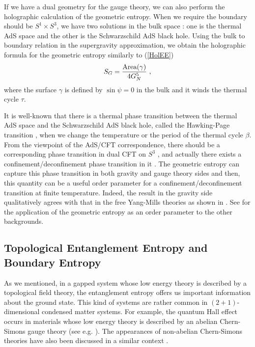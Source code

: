 \documentclass[12pt]{article}
\def\frac#1#2{{#1\over #2}}
\def\g{{\gamma}}
\def\b{{\beta}}
\def\frac#1#2{{#1\over #2}}
\def\g{{\gamma}}
\def\b{{\beta}}
\begin{document}
If we have a dual geometry for the gauge theory, we can also perform the holographic calculation
of the geometric entropy. When we require the boundary should be $S^1 \times S^3$, we have two solutions
in the bulk space \cite{Witten}: one is the thermal AdS space
and the other is the Schwarzschild AdS black hole. Using the bulk to boundary relation in the supergravity approximation, we obtain
the holographic formula for the geometric entropy similarly to (\ref{HolEE})
\begin{equation}
S_G =\frac{\mbox{Area}(\gamma)}{4G_N^{5}} \ ,
\end{equation}
where the surface $\g$ is defined by $\sin\psi =0$ in the bulk and it winds the thermal cycle $\tau$.

It is well-known that there is a thermal phase transition between the thermal AdS space
and the Schwarzschild AdS black hole, called the Hawking-Page transition \cite{HaPe},
when we change the temperature or the period of the thermal cycle $\b$.
From the viewpoint of the AdS/CFT correspondence, there should be a corresponding phase transition
in dual CFT on $S^3$ \cite{Witten}, and actually there exists a confinement/deconfinement phase
transition in it \cite{Su,AMMPR}.
The geometric entropy can capture this phase transition in both gravity and gauge theory sides
and then, this quantity can be a useful order parameter for a confinement/deconfinement transition at
finite temperature. Indeed, the result in the gravity side qualitatively agrees with that in the free Yang-Mills theories
as shown in \cite{Fujita:2008zv}.
See \cite{Bah:2008cj} for the application of the geometric entropy as an order parameter to the other backgrounds.

\subsection{Topological Entanglement Entropy and Boundary Entropy}
\hspace{5mm}
As we mentioned, in a gapped system whose low energy theory is described by a topological field theory,
the entanglement entropy offers us important information about the ground state.
This kind of systems are rather
common in $(2+1)$-dimensional condensed matter systems. For example, the quantum Hall effect occurs in materials whose
low energy theory is described by an abelian Chern-Simons gauge theory (see e.g. \cite{Wen89}).
The appearances of non-abelian
Chern-Simons theories have also been discussed in a similar context \cite{MooreRead}.
\end{document}
